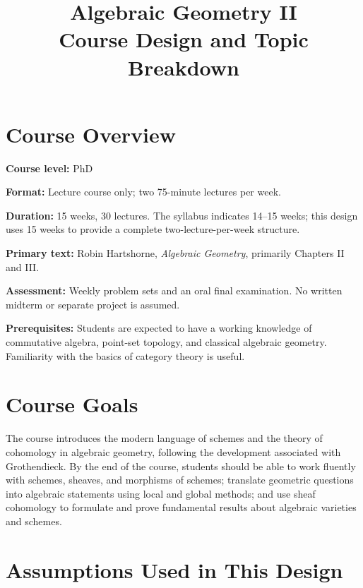 \documentclass[11pt]{article}
\title{Algebraic Geometry II\\
\large Course Design and Topic Breakdown}
\author{}
\date{}
\begin{document}
\maketitle

\section*{Course Overview}

\textbf{Course level:} PhD

\textbf{Format:} Lecture course only; two 75-minute lectures per week.

\textbf{Duration:} 15 weeks, 30 lectures. The syllabus indicates 14--15 weeks; this design uses 15 weeks to provide a complete two-lecture-per-week structure.

\textbf{Primary text:} Robin Hartshorne, \emph{Algebraic Geometry}, primarily Chapters II and III.

\textbf{Assessment:} Weekly problem sets and an oral final examination. No written midterm or separate project is assumed.

\textbf{Prerequisites:} Students are expected to have a working knowledge of commutative algebra, point-set topology, and classical algebraic geometry. Familiarity with the basics of category theory is useful.

\section*{Course Goals}

The course introduces the modern language of schemes and the theory of cohomology in algebraic geometry, following the development associated with Grothendieck. By the end of the course, students should be able to work fluently with schemes, sheaves, and morphisms of schemes; translate geometric questions into algebraic statements using local and global methods; and use sheaf cohomology to formulate and prove fundamental results about algebraic varieties and schemes.

\section*{Assumptions Used in This Design}
\end{document}
